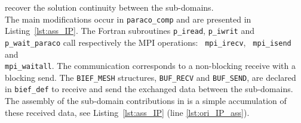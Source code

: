 \begin{enumerate}
recover the solution continuity between the sub-domains.
\\
%
The main modifications occur in \texttt{paraco\_comp} and are presented in Listing~\ref{lst:ass_IP}.
The Fortran subroutines \texttt{p\_iread}, \texttt{p\_iwrit} and  \texttt{p\_wait\_paraco}
call respectively the MPI operations:
\texttt{ mpi\_irecv}, \texttt{ mpi\_isend} and \\ \texttt{mpi\_waitall}.
The communication corresponds to a non-blocking receive
with a blocking send.
The \texttt{BIEF\_MESH} structures, \texttt{BUF\_RECV} and \texttt{BUF\_SEND},
are declared in \texttt{bief\_def} to receive and send the
exchanged data between the sub-domains.
The assembly of the sub-domain contributions in
is a simple accumulation of these received data,
see Listing~\ref{lst:ass_IP} (line \ref{lst:ori_IP_ass}).


\end{enumerate}
